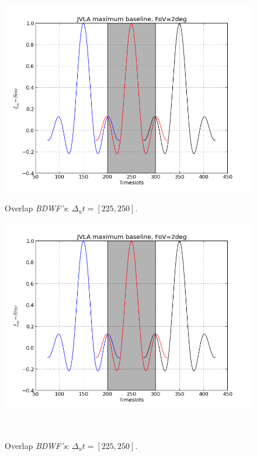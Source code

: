 \documentclass[useAMS,usenatbib]{mn2e}
\begin{document}
\begin{figure}
  \centering
  \begin{minipage}{0.38\linewidth}\includegraphics[width=1\textwidth]{./Figures/corrSigVLAMxBl_overlapLdelta.png}\caption{Overlap 
		\textit{BDWF's}: $\Delta_u t= [225, 250]$.}\label{ fig:fig_3a}\end{minipage}
\begin{minipage}{0.38\linewidth}\includegraphics[width=1\textwidth]{./Figures/corrSigVLAMxBl_overlapLdelta.png}\caption{Overlap 
		\textit{BDWF's}: $\Delta_u t= [225, 250]$.}\label{ fig:fig_3a}\end{minipage}\\

\end{figure}
\end{document}
